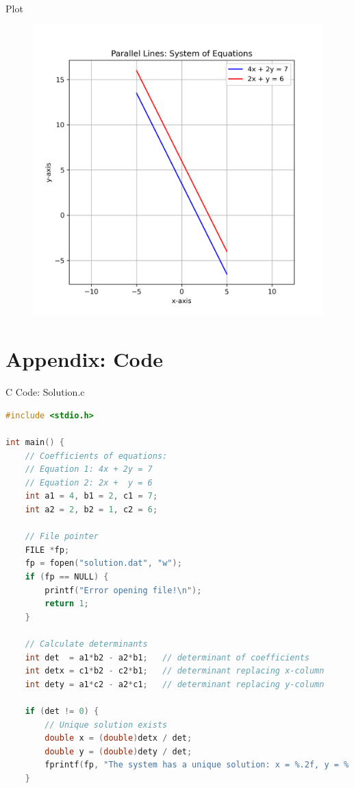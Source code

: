 \documentclass{beamer}
\numberwithin{equation}{section}
\theoremstyle{remark}
\begin{document}
\begin{frame}{Plot}
    \begin{figure}
    \centering
    \includegraphics[width=0.7\columnwidth]{figs/01.png}
    \caption{}
    \label{fig:placeholder}
\end{figure}
\end{frame}

\section*{Appendix: Code}

\begin{frame}[fragile]{C Code: Solution.c}
\begin{lstlisting}[language=C]
#include <stdio.h>

int main() {
    // Coefficients of equations:
    // Equation 1: 4x + 2y = 7
    // Equation 2: 2x +  y = 6
    int a1 = 4, b1 = 2, c1 = 7;
    int a2 = 2, b2 = 1, c2 = 6;

    // File pointer
    FILE *fp;
    fp = fopen("solution.dat", "w");
    if (fp == NULL) {
        printf("Error opening file!\n");
        return 1;
    }

    // Calculate determinants
    int det  = a1*b2 - a2*b1;   // determinant of coefficients
    int detx = c1*b2 - c2*b1;   // determinant replacing x-column
    int dety = a1*c2 - a2*c1;   // determinant replacing y-column

    if (det != 0) {
        // Unique solution exists
        double x = (double)detx / det;
        double y = (double)dety / det;
        fprintf(fp, "The system has a unique solution: x = %.2f, y = %.2f\n", x, y);
    }
    \end{lstlisting}
\end{frame}
\end{document}
